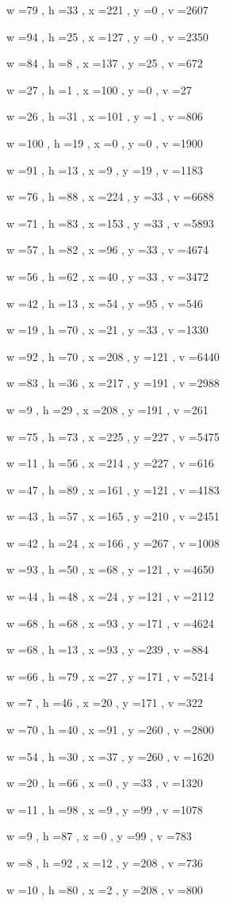 \documentclass[11pt]{article}
\begin{document}
w =79 , h =33 , x =221 , y =0 , v =2607
\par
w =94 , h =25 , x =127 , y =0 , v =2350
\par
w =84 , h =8 , x =137 , y =25 , v =672
\par
w =27 , h =1 , x =100 , y =0 , v =27
\par
w =26 , h =31 , x =101 , y =1 , v =806
\par
w =100 , h =19 , x =0 , y =0 , v =1900
\par
w =91 , h =13 , x =9 , y =19 , v =1183
\par
w =76 , h =88 , x =224 , y =33 , v =6688
\par
w =71 , h =83 , x =153 , y =33 , v =5893
\par
w =57 , h =82 , x =96 , y =33 , v =4674
\par
w =56 , h =62 , x =40 , y =33 , v =3472
\par
w =42 , h =13 , x =54 , y =95 , v =546
\par
w =19 , h =70 , x =21 , y =33 , v =1330
\par
w =92 , h =70 , x =208 , y =121 , v =6440
\par
w =83 , h =36 , x =217 , y =191 , v =2988
\par
w =9 , h =29 , x =208 , y =191 , v =261
\par
w =75 , h =73 , x =225 , y =227 , v =5475
\par
w =11 , h =56 , x =214 , y =227 , v =616
\par
w =47 , h =89 , x =161 , y =121 , v =4183
\par
w =43 , h =57 , x =165 , y =210 , v =2451
\par
w =42 , h =24 , x =166 , y =267 , v =1008
\par
w =93 , h =50 , x =68 , y =121 , v =4650
\par
w =44 , h =48 , x =24 , y =121 , v =2112
\par
w =68 , h =68 , x =93 , y =171 , v =4624
\par
w =68 , h =13 , x =93 , y =239 , v =884
\par
w =66 , h =79 , x =27 , y =171 , v =5214
\par
w =7 , h =46 , x =20 , y =171 , v =322
\par
w =70 , h =40 , x =91 , y =260 , v =2800
\par
w =54 , h =30 , x =37 , y =260 , v =1620
\par
w =20 , h =66 , x =0 , y =33 , v =1320
\par
w =11 , h =98 , x =9 , y =99 , v =1078
\par
w =9 , h =87 , x =0 , y =99 , v =783
\par
w =8 , h =92 , x =12 , y =208 , v =736
\par
w =10 , h =80 , x =2 , y =208 , v =800
\par
\newpage
\end{document}
